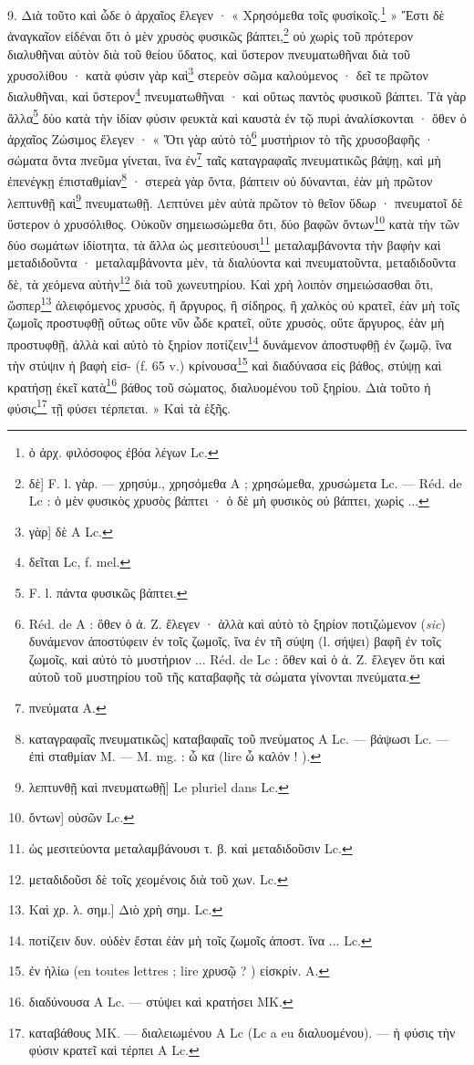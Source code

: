 \documentclass[a4paper, 11pt, oneside, polutonikogreek, french]{article}
\begin{document}
9. Διὰ τοῦτο καὶ ὧδε ὁ ἀρχαῖος ἔλεγεν · « Χρησόμεθα τοῖς φυσίκοῖς.\footnote{ὁ ἀρχ. φιλόσοφος ἐβόα λέγων Lc.} » Ἔστι δὲ ἀναγκαῖον εἰδέναι ὅτι ὁ μὲν χρυσὸς φυσικῶς βάπτει,\footnote{δὲ] F. l. γὰρ. --- χρησύμ., χρησόμεθα A ; χρησώμεθα, χρυσώμετα Lc. --- Réd. de Lc : ὁ μὲν φυσικὸς χρυσὸς βάπτει · ὁ δὲ μὴ φυσικὸς οὐ βάπτει, χωρὶς ...} οὐ χωρὶς τοῦ πρότερον διαλυθῆναι αὐτὸν διὰ τοῦ θείου ὕδατος, καὶ ὕστερον πνευματωθῆναι διὰ τοῦ χρυσολίθου · κατὰ φύσιν γὰρ καὶ\footnote{γὰρ] δὲ A Lc.} στερεὸν σῶμα καλούμενος · δεῖ τε πρῶτον διαλυθῆναι, καὶ ὕστερον\footnote{δεῖται Lc, f. mel.} πνευματωθῆναι · καὶ οὕτως παντὸς φυσικοῦ βάπτει. Τὰ γὰρ ἄλλα\footnote{F. l. πάντα φυσικῶς βάπτει.} δύο κατὰ τὴν ἰδίαν φύσιν φευκτὰ καὶ καυστὰ ἐν τῷ πυρὶ ἀναλίσκονται · ὅθεν ὁ ἀρχαῖος Ζώσιμος ἔλεγεν · « Ὅτι γὰρ αὐτὸ τὸ\footnote{Réd. de A : ὅθεν ὁ ἀ. Ζ. ἔλεγεν · ἀλλὰ καὶ αὐτὸ τὸ ξηρίον ποτιζώμενον (\emph{sic}) δυνάμενον ἀποστύφειν ἐν τοῖς ζωμοῖς, ἵνα ἐν τῆ σύψη (l. σήψει) βαφῆ ἐν τοῖς ζωμοῖς, καὶ αὐτὸ τὸ μυστήριον ... Réd. de Lc : ὅθεν καὶ ὁ ἀ. Ζ. ἔλεγεν ὅτι καὶ αὐτοῦ τοῦ μυστηρίου τοῦ τῆς καταβαφῆς τὰ σώματα γίνονται πνεύματα.} μυστήριον τὸ τῆς χρυσοβαφῆς · σώματα ὄντα πνεῦμα γίνεται, ἵνα ἐν\footnote{πνεύματα A.} ταῖς καταγραφαῖς πνευματικῶς βάψῃ, καὶ μὴ ἐπενέγκῃ ἐπισταθμίαν\footnote{καταγραφαῖς πνευματικῶς] καταβαφαῖς τοῦ πνεύματος A Lc. --- βάψωσι Lc. --- ἐπὶ σταθμίαν M. --- M. mg. : ὦ κα (lire ὧ καλόν ! ).} · στερεὰ γὰρ ὄντα, βάπτειν οὐ δύνανται, ἐὰν μὴ πρῶτον λεπτυνθῇ καὶ\footnote{λεπτυνθῇ καὶ πνευματωθῇ] Le pluriel dans Lc.} πνευματωθῇ. Λεπτύνει μὲν αὐτὰ πρῶτον τὸ θεῖον ὕδωρ · πνευματοῖ δὲ ὕστερον ὁ χρυσόλιθος. Οὐκοῦν σημειωσώμεθα ὅτι, δύο βαφῶν ὄντων\footnote{ὄντων] οὐσῶν Lc.} κατὰ τὴν τῶν δύο σωμάτων ἰδίοτητα, τὰ ἄλλα ὡς μεσιτεύουσι\footnote{ὡς μεσιτεύοντα μεταλαμβάνουσι τ. β. καὶ μεταδιδοῦσιν Lc.} μεταλαμβάνοντα τὴν βαφὴν καὶ μεταδιδοῦντα · μεταλαμβάνοντα μὲν, τὰ διαλύοντα καὶ πνευματοῦντα, μεταδιδοῦντα δὲ, τὰ χεόμενα αὐτὴν\footnote{μεταδιδοῦσι δὲ τοῖς χεομένοις διὰ τοῦ χων. Lc.} διὰ τοῦ χωνευτηρίου. Καὶ χρὴ λοιπὸν σημειώσασθαι ὅτι, ὥσπερ\footnote{Καὶ χρ. λ. σημ.] Διὸ χρὴ σημ. Lc.} ἀλειφόμενος χρυσὸς, ἢ ἄργυρος, ἢ σίδηρος, ἢ χαλκὸς οὐ κρατεῖ, ἐὰν μὴ τοῖς ζωμοῖς προστυφθῇ οὕτως οὔτε νῦν ὧδε κρατεῖ, οὔτε χρυσὸς, οὔτε ἄργυρος, ἐὰν μὴ προστυφθῇ, ἀλλὰ καὶ αὐτὸ τὸ ξηρίον ποτίζειν\footnote{ποτίζειν δυν. οὐδὲν ἔσται ἐὰν μὴ τοῖς ζωμοῖς ἀποστ. ἵνα ... Lc.} δυνάμενον ἀποστυφθῇ ἐν ζωμῷ, ἵνα τὴν στύψιν ἡ βαφὴ εἰσ- (f. 65 v.) κρίνουσα\footnote{ἐν ἡλίω (en toutes lettres ; lire χρυσῷ ? ) εἰσκρίν. A.} καὶ διαδύνασα εἰς βάθος, στύψῃ καὶ κρατήσῃ ἐκεῖ κατὰ\footnote{διαδύνουσα A Lc. --- στύψει καὶ κρατήσει MK.} βάθος τοῦ σώματος, διαλυομένου τοῦ ξηρίου. Διὰ τοῦτο ἡ φύσις\footnote{καταβάθους MK. --- διαλειωμένου A Lc (Lc a eu διαλυομένου). --- ἡ φύσις τὴν φύσιν κρατεῖ καὶ τέρπει A Lc.} τῇ φύσει τέρπεται. » Καὶ τὰ ἑξῆς.
\end{document}
